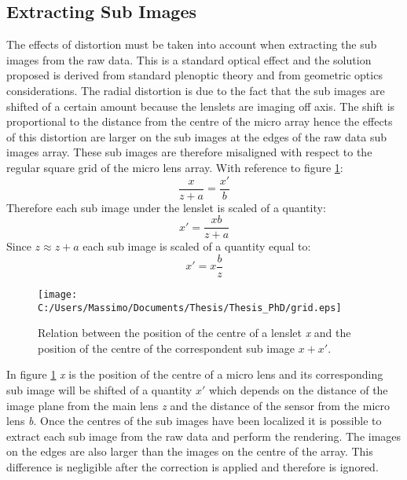 \subsection{Extracting Sub Images}
\label{sec:isolating}
The effects of distortion must be taken into account when extracting the sub images from the raw data. This is a standard optical effect and the solution proposed is derived from standard plenoptic theory and from geometric optics considerations. 
The radial distortion is due to the fact that the sub images are shifted of a certain amount because the lenslets are imaging off axis. The shift is proportional to the distance from the centre of the micro array \cite{pedrotti1993introduction} hence the effects of this distortion are larger on the sub images at the edges of the raw data sub images array. These sub images are therefore misaligned with respect to the regular square grid of the micro lens array. 
With reference to figure \ref{fig:grid}:
\begin{equation}
 \label{eq:pincushio1}
\dfrac{x}{z+a}=\dfrac{x'}{b}
\end{equation}
Therefore each sub image under the lenslet is scaled of a quantity:
 \begin{equation}
 \label{eq:pincushion2}
 x' = \dfrac{xb}{z+a}
 \end{equation}
 Since $z \approx z+a$ each sub image is scaled of a quantity equal to:
\begin{equation}
\label{eq:pincushion}
x' = x\dfrac{b}{z}
\end{equation}
\begin{figure}[H]
	\centering
	\texttt{[image: C:/Users/Massimo/Documents/Thesis/Thesis\_PhD/grid.eps]}
	\caption{\label{fig:grid} Relation between the position of the centre of a lenslet \textit{x} and the position of the centre of the correspondent sub image $x + x'$.  }
\end{figure}
In figure \ref{fig:grid} \textit{x} is the position of the centre of a micro lens and its corresponding sub image will be shifted of a quantity $x'$ which depends on the distance of the image plane from the main lens \textit{z} and the distance of the sensor from the micro lens \textit{b}. Once the centres of the sub images have been localized it is possible to extract each sub image from the raw data and perform the rendering. The images on the edges are also larger than the images on the centre of the array. This difference is negligible after the correction is applied and therefore is ignored.
